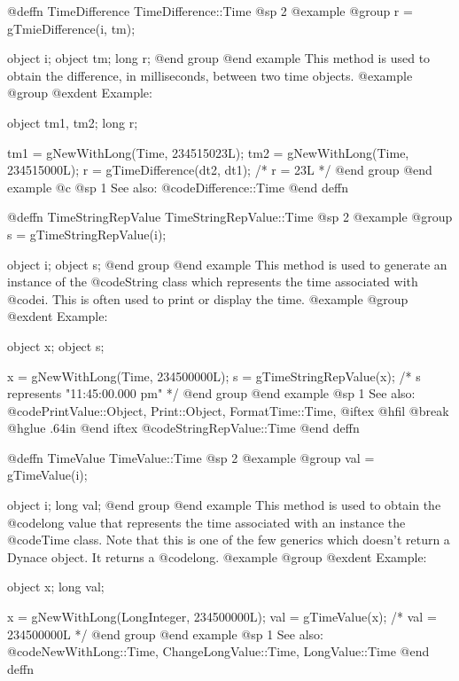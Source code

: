 @deffn {TimeDifference} TimeDifference::Time
@sp 2
@example
@group
r = gTmieDifference(i, tm);

object  i;
object  tm;
long    r;
@end group
@end example
This method is used to obtain the difference, in milliseconds,
between two time objects.  
@example
@group
@exdent Example:

object  tm1, tm2;
long    r;

tm1 = gNewWithLong(Time, 234515023L);
tm2 = gNewWithLong(Time, 234515000L);
r = gTimeDifference(dt2, dt1);    /*  r = 23L  */
@end group
@end example
@c @sp 1
See also:  @code{Difference::Time}
@end deffn







@deffn {TimeStringRepValue} TimeStringRepValue::Time
@sp 2
@example
@group
s = gTimeStringRepValue(i);

object  i;
object  s;
@end group
@end example
This method is used to generate an instance of the @code{String} class
which represents the time associated with @code{i}.  This is often
used to print or display the time.
@example
@group
@exdent Example:

object  x;
object  s;

x = gNewWithLong(Time, 234500000L);
s = gTimeStringRepValue(x);
    /* s represents "11:45:00.000 pm"  */
@end group
@end example
@sp 1
See also:  @code{PrintValue::Object, Print::Object, FormatTime::Time,}
@iftex
@hfil @break @hglue .64in      
@end iftex
@code{StringRepValue::Time}
@end deffn










@deffn {TimeValue} TimeValue::Time
@sp 2
@example
@group
val = gTimeValue(i);

object  i;
long    val;
@end group
@end example
This method is used to obtain the @code{long} value that represents
the time associated with an instance the @code{Time} class.  Note that
this is one of the few generics which doesn't return a Dynace object.
It returns a @code{long}.
@example
@group
@exdent Example:

object  x;
long    val;

x = gNewWithLong(LongInteger, 234500000L);
val = gTimeValue(x);    /*  val = 234500000L  */
@end group
@end example
@sp 1
See also:  @code{NewWithLong::Time, ChangeLongValue::Time, LongValue::Time}
@end deffn










